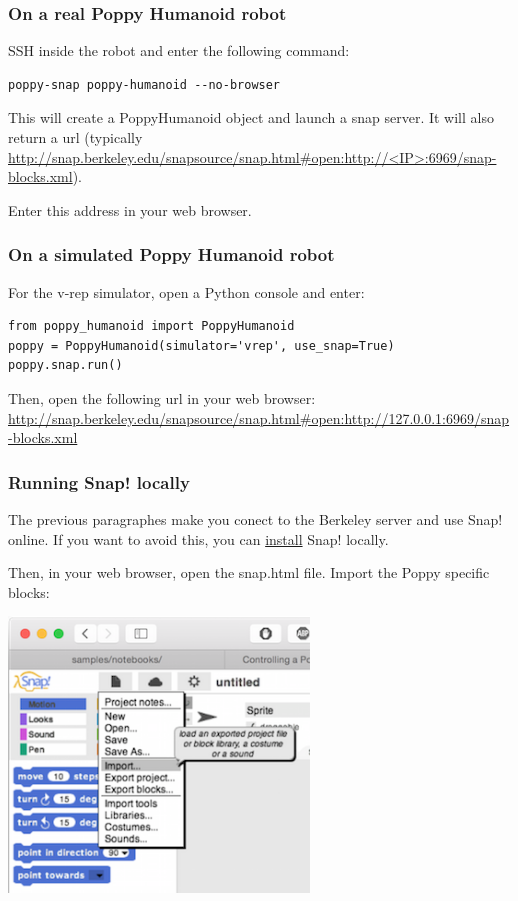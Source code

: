 \documentclass{article}
\begin{document}
\subsubsection{On a real Poppy Humanoid robot}

SSH inside the robot and enter the following command:

\begin{verbatim}
poppy-snap poppy-humanoid --no-browser
\end{verbatim}

This will create a PoppyHumanoid object and launch a snap server. It will also return a url (typically \url{http://snap.berkeley.edu/snapsource/snap.html#open:http://<IP>:6969/snap-blocks.xml}).

Enter this address in your web browser.

\subsubsection{On a simulated Poppy Humanoid robot}

For the v-rep simulator, open a Python console and enter:

\begin{verbatim}
from poppy_humanoid import PoppyHumanoid
poppy = PoppyHumanoid(simulator='vrep', use_snap=True)
poppy.snap.run()
\end{verbatim}

Then, open the following url in your web browser: \url{http://snap.berkeley.edu/snapsource/snap.html#open:http://127.0.0.1:6969/snap-blocks.xml}

\subsubsection{Running Snap! locally}

The previous paragraphes make you conect to the Berkeley server and use Snap! online. If you want to avoid this, you can \href{https://github.com/jmoenig/Snap--Build-Your-Own-Blocks}{install} Snap! locally.

Then, in your web browser, open the snap.html file. Import the Poppy specific blocks:

 \begin{center}
  \includegraphics[width=0.6\textwidth]{img/snap-import}
 \end{center}
\end{document}

